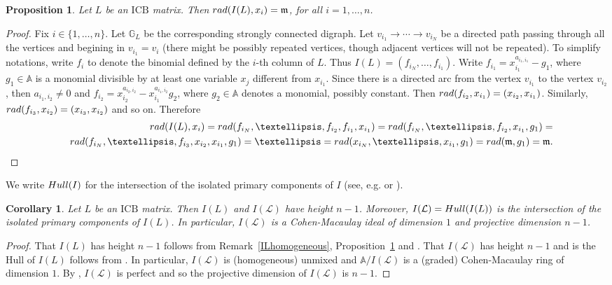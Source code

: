 \documentclass[10pt]{amsart}
\newcommand{\eg}{e.g.}
\newcommand{\mba}{\mbox{$\mathbb{A}$}}
\newcommand{\mbg}{\mbox{$\mathbb{G}$}}
\newcommand{\mcl}{\mbox{$\mathcal{L}$}}
\newcommand{\icb}{\mbox{$\mathrm{ICB}$}}
\newcommand{\mfm}{\mbox{$\mathfrak{m}$}}
\newcommand{\rad}{\mbox{${\rm rad}$}}
\newcommand{\hull}{\mbox{${\rm Hull}$}}
\newtheorem{corollary}[cdrthm]{Corollary}
\newtheorem{proposition}[cdrthm]{Proposition}
\theoremstyle{definition}
\theoremstyle{remark}
\begin{document}
\begin{proposition}\label{radical}
Let $L$ be an $\icb$ matrix. Then $\rad(I(L),x_{i})=\mfm$, for all
$i=1,\ldots ,n$.
\end{proposition}
\begin{proof}
Fix $i\in\{1,\ldots ,n\}$. Let $\mbg_L$ be the corresponding strongly
connected digraph. Let $v_{i_1}\to\cdots\to v_{i_N}$ be a directed
path passing through all the vertices and begining in $v_{i_1}=v_i$
(there might be possibly repeated vertices, though adjacent vertices
will not be repeated). To simplify notations, write $f_i$ to denote
the binomial defined by the $i$-th column of $L$. Thus
$I(L)=(f_{i_N},\ldots ,f_{i_1})$. Write
$f_{i_1}=x_{i_1}^{a_{i_1,i_1}}-g_1$, where $g_1\in \mba$ is a monomial
divisible by at least one variable $x_j$ different from $x_{i_1}$.
Since there is a directed arc from the vertex $v_{i_1}$ to the vertex
$v_{i_2}$, then $a_{i_1,i_2}\neq 0$ and
$f_{i_2}=x_{i_2}^{a_{i_2,i_2}}-x_{i_1}^{a_{i_1,i_2}}g_2$, where
$g_2\in \mba$ denotes a monomial, possibly constant. Then
$\rad(f_{i_2},x_{i_1})=(x_{i_2},x_{i_1})$.  Similarly,
$\rad(f_{i_3},x_{i_2})=(x_{i_3},x_{i_2})$ and so on. Therefore
\begin{eqnarray*}
&&\rad(I(L),x_{i})=\rad(f_{i_N},\ldots
  ,f_{i_2},f_{i_1},x_{i_1})=\rad(f_{i_N},\ldots
  ,f_{i_2},x_{i_1},g_1)=\\ &&\rad(f_{i_N},\ldots
  ,f_{i_3},x_{i_2},x_{i_1},g_1)=\ldots =\rad(x_{i_N},\ldots
  ,x_{i_1},g_1)=\rad(\mfm,g_1)=\mfm.
\end{eqnarray*}
\end{proof}

We write $\hull(I)$ for the intersection of the isolated primary
components of $I$ (see, \eg \cite{op} or \cite{opv}).

\begin{corollary}\label{projdim}
Let $L$ be an $\icb$ matrix. Then $I(L)$ and $I(\mcl)$ have height
$n-1$. Moreover, $I(\mcl)=\hull(I(L))$ is the intersection of the
isolated primary components of $I(L)$. In particular, $I(\mcl)$ is a
Cohen-Macaulay ideal of dimension $1$ and projective dimension $n-1$.
\end{corollary}
\begin{proof}
That $I(L)$ has height $n-1$ follows from Remark~\ref{ILhomogeneous},
Proposition~\ref{radical} and \cite[Lemma~5.1]{opv}. That $I(\mcl)$
has height $n-1$ and is the Hull of $I(L)$ follows from
\cite[Proposition~5.7]{opv}. In particular, $I(\mcl)$ is (homogeneous)
unmixed and $\mba/I(\mcl)$ is a (graded) Cohen-Macaulay ring of dimension
$1$. By \cite[Corollary~2.2.15]{bh}, $I(\mcl)$ is perfect and so the
projective dimension of $I(\mcl)$ is $n-1$.
\end{proof}
\end{document}
